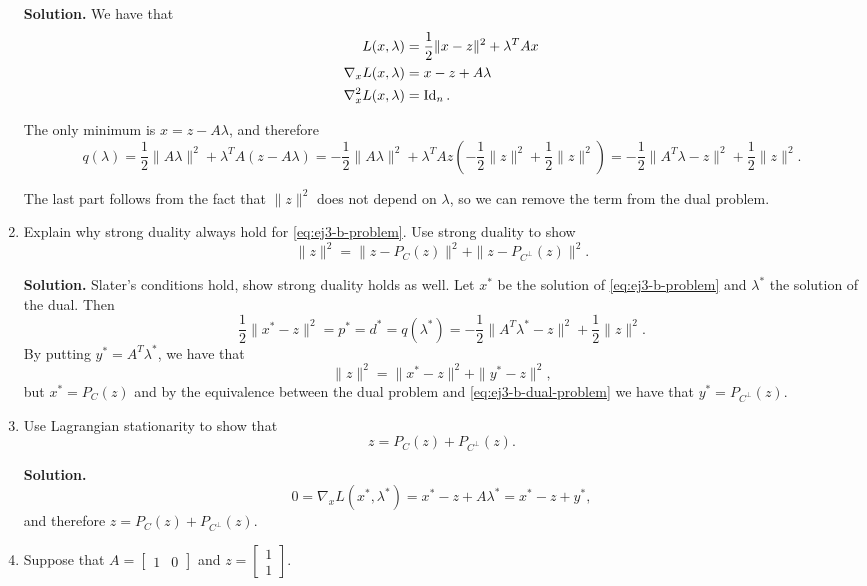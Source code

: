 \begin{enumerate}[label=(\alph*)]
      \medskip\textbf{Solution.} We have that
      \[
      \begin{aligned}
        L(x,\lambda) & = \frac{1}{2} \|x-z\|^2 + \lambda^T Ax \\
        \nabla_x L(x,\lambda) & = x-z+A\lambda \\
        \nabla_x^2 L(x,\lambda) & = \operatorname{Id}_n.
      \end{aligned}
      \]

      The only minimum is $x=z- A\lambda$, and therefore
      \[
      q(\lambda)=
      \frac{1}{2}\|A\lambda\|^2 + \lambda^T A (z-A\lambda) =
      -\frac{1}{2}\|A\lambda\|^2 + \lambda^T A z \left( -\frac{1}{2}\|z\|^2 + \frac{1}{2}\|z\|^2 \right) =
      -\frac{1}{2}\|A^T\lambda-z\|^2 + \frac{1}{2}\|z\|^2
      .\]

      The last part follows from the fact that $\|z\|^2$ does not depend on
      $\lambda$, so we can remove the term from the dual problem.

    \item Explain why strong duality always hold for \autoref{eq:ej3-b-problem}. Use
      strong duality to show
      \begin{equation}
        \label{eq:ej3-c}
        \|z\|^2 = \|z-P_C(z)\|^2 + \|z-P_{C^\bot}(z)\|^2
      .\end{equation}

      \medskip\textbf{Solution.} Slater's conditions hold, show strong duality
      holds as well. Let $x^*$ be the solution of \autoref{eq:ej3-b-problem} and
      $\lambda^*$ the solution of the dual. Then
      \[
      \frac{1}{2}\|x^*-z\|^2 = p^* = d^* = q(\lambda^*)=
      -\frac{1}{2}\|A^T \lambda^* - z\|^2 + \frac{1}{2}\|z\|^2
      .\] 
      By putting $y^*=A^T\lambda^*$, we have that 
      \[
      \|z\|^2 = \|x^*-z\|^2 + \|y^*-z\|^2
      ,\] 
      but $x^*=P_C(z)$ and by the equivalence between the dual problem and
      \autoref{eq:ej3-b-dual-problem} we have that  $y^*=P_{C^\bot}(z)$.

    \item Use Lagrangian stationarity to show that
      \[
      z= P_C(z) + P_{C^\bot}(z)
      .\]

      \medskip\textbf{Solution.}
      \[
      0=\nabla_x L(x^*,\lambda^*) = 
      x^*-z+A\lambda^* =
      x^*-z+y^*
      ,\] 
      and therefore $z= P_C(z) + P_{C^\bot}(z)$.

    \item Suppose that $A=\begin{bmatrix} 1 & 0 \end{bmatrix} $ and
      $z=\begin{bmatrix} 1 \\ 1 \end{bmatrix} $.


\end{enumerate}
